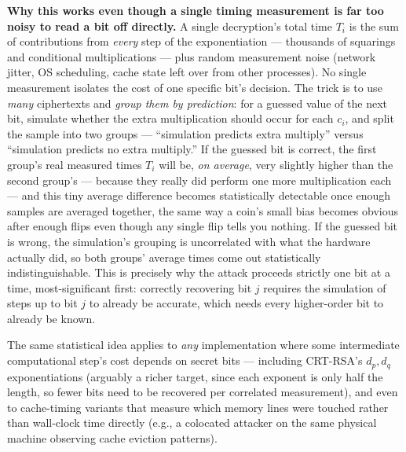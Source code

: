 \medskip\noindent\textbf{Why this works even though a single timing measurement is far too noisy to read a bit off directly.} A single decryption's total time $T_i$ is the sum of contributions from \emph{every} step of the exponentiation — thousands of squarings and conditional multiplications — plus random measurement noise (network jitter, OS scheduling, cache state left over from other processes). No single measurement isolates the cost of one specific bit's decision. The trick is to use \emph{many} ciphertexts and \emph{group them by prediction}: for a guessed value of the next bit, simulate whether the extra multiplication should occur for each $c_i$, and split the sample into two groups — ``simulation predicts extra multiply'' versus ``simulation predicts no extra multiply.'' If the guessed bit is correct, the first group's real measured times $T_i$ will be, \emph{on average}, very slightly higher than the second group's — because they really did perform one more multiplication each — and this tiny average difference becomes statistically detectable once enough samples are averaged together, the same way a coin's small bias becomes obvious after enough flips even though any single flip tells you nothing. If the guessed bit is wrong, the simulation's grouping is uncorrelated with what the hardware actually did, so both groups' average times come out statistically indistinguishable. This is precisely why the attack proceeds strictly one bit at a time, most-significant first: correctly recovering bit $j$ requires the simulation of steps up to bit $j$ to already be accurate, which needs every higher-order bit to already be known.

\begin{remark}
The same statistical idea applies to \emph{any} implementation where some intermediate computational step's cost depends on secret bits — including CRT-RSA's $d_p, d_q$ exponentiations (arguably a richer target, since each exponent is only half the length, so fewer bits need to be recovered per correlated measurement), and even to cache-timing variants that measure which memory lines were touched rather than wall-clock time directly (e.g., a colocated attacker on the same physical machine observing cache eviction patterns).
\end{remark}

